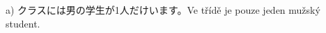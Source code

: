 a) クラスには男の学生が1人だけいます。Ve třídě je pouze jeden mužský student.


















































